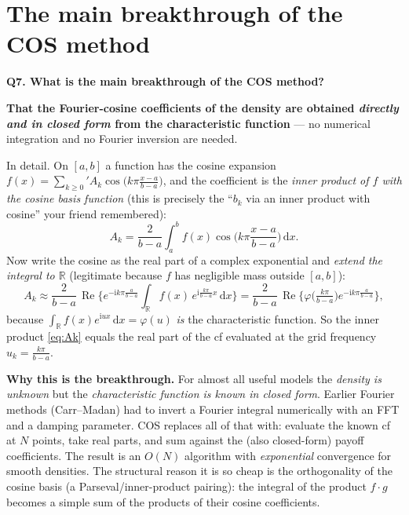 \documentclass[11pt]{article}
\newcommand{\R}{\mathbb{R}}
\newcommand{\Real}{\operatorname{Re}}
\newcommand{\ii}{\mathrm{i}}
\newcommand{\dd}{\,\mathrm{d}}
\newcommand{\ch}{\varphi}
\newcommand{\Qhead}[1]{\bigskip\noindent\textbf{\large #1}\par\nobreak\smallskip}
\begin{document}
\section{The main breakthrough of the COS method}
\Qhead{Q7. What is the main breakthrough of the COS method?}
\textbf{That the Fourier-cosine coefficients of the density are obtained \emph{directly and in closed form}
from the characteristic function} --- no numerical integration and no Fourier inversion are needed.

In detail. On $[a,b]$ a function has the cosine expansion $f(x)=\sum_{k\ge0}{}'A_k\cos\!\big(k\pi\frac{x-a}{b-a}\big)$,
and the coefficient is the \emph{inner product of $f$ with the cosine basis function} (this is precisely the
``$b_k$ via an inner product with cosine'' your friend remembered):
\begin{equation}\label{eq:Ak}
A_k=\frac{2}{b-a}\int_a^b f(x)\cos\!\Big(k\pi\frac{x-a}{b-a}\Big)\dd x .
\end{equation}
Now write the cosine as the real part of a complex exponential and \emph{extend the integral to $\R$} (legitimate
because $f$ has negligible mass outside $[a,b]$):
\begin{equation}\label{eq:AkPhi}
A_k\approx\frac{2}{b-a}\,\Real\!\Big\{e^{-\ii k\pi\frac{a}{b-a}}\!\int_{\R}\! f(x)\,e^{\ii\frac{k\pi}{b-a}x}\dd x\Big\}
       =\frac{2}{b-a}\,\Real\!\Big\{\ch\!\Big(\tfrac{k\pi}{b-a}\Big)e^{-\ii k\pi\frac{a}{b-a}}\Big\},
\end{equation}
because $\int_{\R}f(x)e^{\ii ux}\dd x=\ch(u)$ \emph{is} the characteristic function. So the inner product
\eqref{eq:Ak} equals the real part of the cf evaluated at the grid frequency $u_k=\tfrac{k\pi}{b-a}$.

\textbf{Why this is the breakthrough.} For almost all useful models the \emph{density is unknown} but the
\emph{characteristic function is known in closed form}. Earlier Fourier methods (Carr--Madan) had to invert a
Fourier integral numerically with an FFT and a damping parameter. COS replaces all of that with: evaluate the
known cf at $N$ points, take real parts, and sum against the (also closed-form) payoff coefficients. The result
is an $O(N)$ algorithm with \emph{exponential} convergence for smooth densities. The structural reason it is
so cheap is the orthogonality of the cosine basis (a Parseval/inner-product pairing): the integral of the
product $f\cdot g$ becomes a simple sum of the products of their cosine coefficients.
\end{document}
